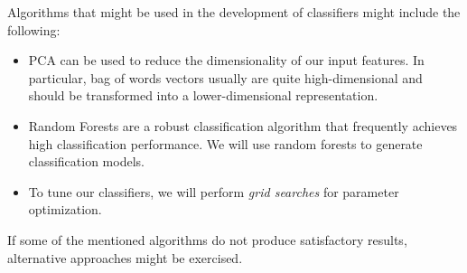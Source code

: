 \documentclass[12pt]{elsarticle}
\begin{document}
Algorithms that might be used in the development of classifiers might include the following:
\begin{itemize}
\item PCA can be used to reduce the dimensionality of our input features. In particular, bag of words vectors usually are quite high-dimensional and should be transformed into a lower-dimensional representation. 
\item Random Forests are a robust classification algorithm that frequently achieves high classification performance. We will use random forests to generate classification models.
\item To tune our classifiers, we will perform \textit{grid searches} for parameter optimization.
\end{itemize}

If some of the mentioned algorithms do not produce satisfactory results, alternative approaches might be exercised.

\vfill


\end{document}

